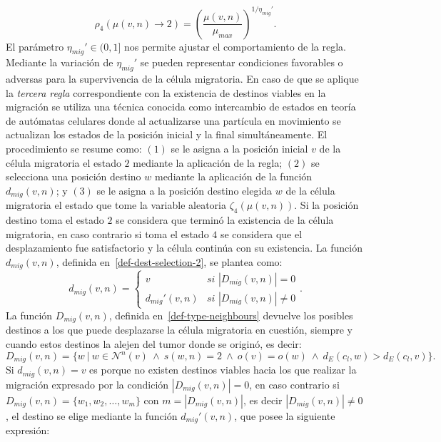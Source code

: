 \begin{equation*}
\rho_4(\mu(v,n) \rightarrow 2) = \left(\displaystyle\frac{\mu(v,n)}{\mu_{max}} \right)^{\displaystyle 1 / \eta_{mig}'}.
\end{equation*}
El par\'ametro $\eta_{mig}' \in (0,1]$ nos permite ajustar el comportamiento de la regla. Mediante la variaci\'on de $\eta_{mig}'$ se pueden representar condiciones favorables o adversas para la supervivencia de la c\'elula migratoria. En caso de que se aplique la \emph{tercera regla} correspondiente con la existencia de destinos viables en la migraci\'on se utiliza una t\'ecnica conocida como intercambio de estados en teor\'ia de aut\'omatas celulares donde al actualizarse una part\'icula en movimiento se actualizan los estados de la posici\'on inicial y la final simult\'aneamente. El procedimiento se resume como: $(1)$ se le asigna a la posici\'on inicial $v$ de la c\'elula migratoria el estado $2$ mediante la aplicaci\'on de la regla; $(2)$ se selecciona una posici\'on destino $w$ mediante la aplicaci\'on de la funci\'on $d_{mig}(v,n)$; y $(3)$ se le asigna a la posici\'on destino elegida $w$ de la c\'elula migratoria el estado que tome la variable aleatoria $\zeta_4(\mu(v,n))$. Si la posici\'on destino toma el estado $2$ se considera que termin\'o la existencia de la c\'elula migratoria, en caso contrario si toma el estado $4$ se considera que el desplazamiento fue satisfactorio y la c\'elula contin\'ua con su existencia. La funci\'on $d_{mig}(v,n)$, definida en~\ref{def-dest-selection-2}, se plantea como:
\begin{equation*}
d_{mig}(v,n) = \left\lbrace
	\begin{array}{ll}
		v & \textit{si } |D_{mig}(v,n)|=0\\
		d_{mig}'(v,n) & \textit{si } |D_{mig}(v,n)|\neq 0		
	\end{array}
\right.. 
\end{equation*}
La funci\'on $D_{mig}(v,n)$, definida en~\ref{def-type-neighbours} devuelve los posibles destinos a los que puede desplazarse la c\'elula migratoria en cuesti\'on, siempre y cuando estos destinos la alejen del tumor donde se origin\'o, es decir:
\begin{equation*}
D_{mig}(v,n) = \lbrace w~|~w \in \mathcal{N}^n(v)~\wedge~s(w,n)=2~\wedge~o(v) = o(w)~\wedge~d_E(c_l,w) > d_E(c_l,v) \rbrace.
\end{equation*}
Si $d_{mig}(v,n) = v$ es porque no existen destinos viables hacia los que realizar la migraci\'on expresado por la condici\'on $|D_{mig}(v,n)|=0$, en caso contrario si $D_{mig}(v,n)= \lbrace w_1,w_2,\ldots,w_m \rbrace$ con $m = |D_{mig}(v,n)|$, es decir $|D_{mig}(v,n)|\neq 0$, el destino se elige mediante la funci\'on $d_{mig}'(v,n)$, que posee la siguiente expresi\'on:
